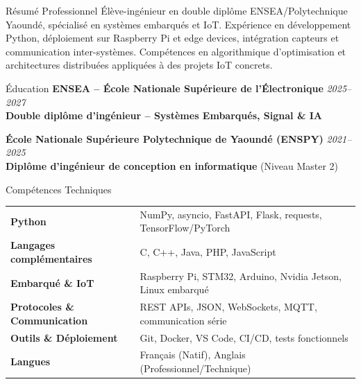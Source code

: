 \documentclass[10pt]{resume}
\begin{document}
\begin{rSection}{Résumé Professionnel}
Élève-ingénieur en double diplôme ENSEA/Polytechnique Yaoundé, spécialisé en systèmes embarqués et IoT. Expérience en développement Python, déploiement sur Raspberry Pi et edge devices, intégration capteurs et communication inter-systèmes. Compétences en algorithmique d'optimisation et architectures distribuées appliquées à des projets IoT concrets.
\end{rSection}

\begin{rSection}{Éducation}
{\bf ENSEA -- École Nationale Supérieure de l'Électronique} \hfill {\em 2025--2027}\\
\textbf{Double diplôme d'ingénieur -- Systèmes Embarqués, Signal \& IA}

{\bf École Nationale Supérieure Polytechnique de Yaoundé (ENSPY)} \hfill {\em 2021--2025}\\
\textbf{Diplôme d'ingénieur de conception en informatique} (Niveau Master 2)
\end{rSection}

\begin{rSection}{Compétences Techniques}
\begin{tabular}{ @{} >{\bfseries}l @{\hspace{5ex}} l }
Python & NumPy, asyncio, FastAPI, Flask, requests, TensorFlow/PyTorch \\
Langages complémentaires & C, C++, Java, PHP, JavaScript \\
Embarqué \& IoT & Raspberry Pi, STM32, Arduino, Nvidia Jetson, Linux embarqué \\
Protocoles \& Communication & REST APIs, JSON, WebSockets, MQTT, communication série \\
Outils \& Déploiement & Git, Docker, VS Code, CI/CD, tests fonctionnels \\
Langues & Français (Natif), Anglais (Professionnel/Technique)
\end{tabular}
\end{rSection}
\end{document}
